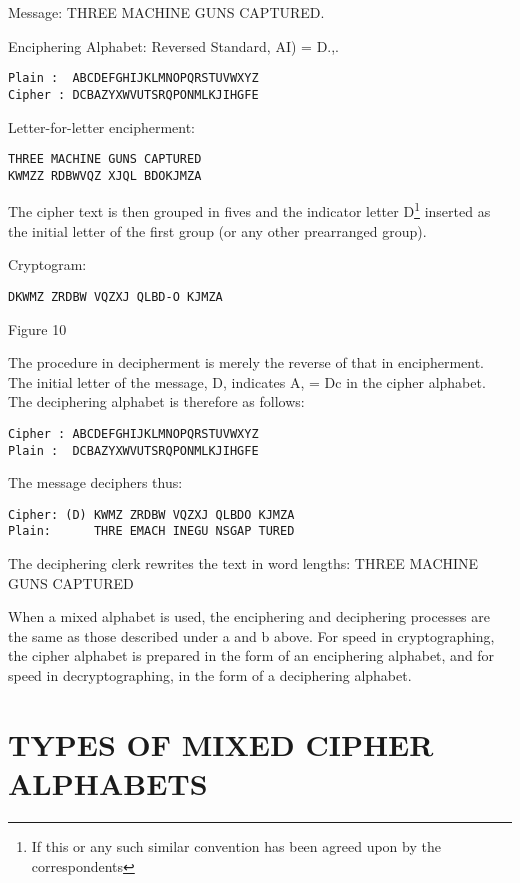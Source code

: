 Message: THREE MACHINE GUNS CAPTURED.

Enciphering Alphabet: Reversed Standard, AI) = D.,.

\begin{verbatim}
Plain :  ABCDEFGHIJKLMNOPQRSTUVWXYZ
Cipher : DCBAZYXWVUTSRQPONMLKJIHGFE
\end{verbatim}

Letter-for-letter encipherment:

\begin{verbatim}
THREE MACHINE GUNS CAPTURED
KWMZZ RDBWVQZ XJQL BDOKJMZA
\end{verbatim}

The cipher text is then grouped in ﬁves and the indicator letter D\footnote{If this or any such similar convention has been agreed upon by the correspondents}
inserted as the initial letter of the ﬁrst group (or any other prearranged
group).

Cryptogram:
\begin{textfigure}
        \begin{verbatim}
DKWMZ ZRDBW VQZXJ QLBD-O KJMZA
        \end{verbatim}
        \caption{Figure 10}
\end{textfigure}

\mypara The procedure in decipherment is merely the reverse of that in
encipherment. The initial letter of the message, D, indicates A, = Dc in
the cipher alphabet. The deciphering alphabet is therefore as follows:

\begin{verbatim}
Cipher : ABCDEFGHIJKLMNOPQRSTUVWXYZ
Plain :  DCBAZYXWVUTSRQPONMLKJIHGFE
\end{verbatim}

The message deciphers thus:
\begin{verbatim}
Cipher: (D) KWMZ ZRDBW VQZXJ QLBDO KJMZA
Plain:      THRE EMACH INEGU NSGAP TURED
\end{verbatim}

The deciphering clerk rewrites the text in word lengths:
THREE MACHINE GUNS CAPTURED

\mypara When a mixed alphabet is used, the enciphering and deciphering
processes are the same as those described under a and b above. For
speed in cryptographing, the cipher alphabet is prepared in the form of
an enciphering alphabet, and for speed in decryptographing, in the form
of a deciphering alphabet.

\section{TYPES OF MIXED CIPHER ALPHABETS}
